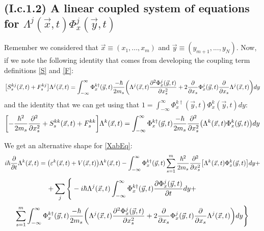 \documentclass[11pt, a4paper]{article} %
\begin{document}
\subsection*{(I.c.1.2) A linear coupled system of equations for $\Lambda^j(\vec{x},t) \Phi^j_x(\vec{y},t)$ }
\vspace{-0.3cm}

Remember we considered that $\vec{x}\equiv (x_1,...,x_m)$ and $\vec{y}\equiv (y_{m+1},...,y_N)$. Now, if we note the following identity that comes from developing the coupling term definitions \eqref{S} and \eqref{F}:
\begin{equation}
\qty[S^{kj}_s(\vec{x},t)+F_s^{kj}]\Lambda^j(\vec{x},t)=\int_{-\infty}^\infty \Phi^{k\dagger}_x(\vec{y},t) \frac{-\hbar}{2m_s}\qty( \Lambda^j(\vec{x},t)\pdv[2]{\Phi^j_x(\vec{y},t)}{x_s}+2\pdv{}{x_s}\Phi^j_x(\vec{y},t)\pdv{}{x_s}\Lambda^j(\vec{x},t) ) dy
\end{equation}
and the identity that we can get using that $1=\int_{-\infty}^\infty \Phi^{k\dagger}_x(\vec{y},t) \Phi^k_x(\vec{y},t)dy$:
\begin{equation}
\qty[-\frac{\hbar^2}{2m_s}\pdv[2]{}{x_s}+S^{kk}_s(\vec{x},t)+F_s^{kk}]\Lambda^k(\vec{x},t)=\int_{-\infty}^\infty \Phi^{k\dagger}_x(\vec{y},t) \frac{-\hbar}{2m_s} \pdv[2]{}{x_s}\qty(\Lambda^k(\vec{x},t)\Phi^k_x(\vec{y},t))dy
\end{equation}

We get an alternative shape for \eqref{XabEq}:
\begin{equation}
i\hbar \pdv{}{t}\Lambda^k(\vec{x},t)=\qty( \varepsilon^k(\vec{x},t)+V(\vec{x},t) )\Lambda^k(\vec{x},t) -\int_{-\infty}^\infty \Phi^{k\dagger}_x(\vec{y},t) \sum_{s=1}^m\frac{\hbar^2}{2m_s}\pdv[2]{}{x_s}\qty[\Lambda^k(\vec{x},t)\Phi^k_x(\vec{y},t) ]dy+
\end{equation}
$$
\hspace*{-1cm}
    +\sum_j\Bigg\{-i\hbar \Lambda^j(\vec{x},t)\int_{-\infty}^\infty \Phi^{k\dagger}_x(\vec{y},t)\pdv{\Phi^j_x(\vec{y},t)}{t}dy+
$$
$$
\sum_{s=1}^m\int_{-\infty}^\infty \Phi^{k\dagger}_x(\vec{y},t) \frac{-\hbar}{2m_s}\qty( \Lambda^j(\vec{x},t)\pdv[2]{\Phi^j_x(\vec{y},t)}{x_s}+2\pdv{}{x_s}\Phi^j_x(\vec{y},t)\pdv{}{x_s}\Lambda^j(\vec{x},t) ) dy\Bigg\}
$$
\end{document}
